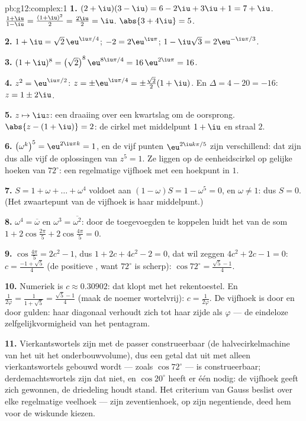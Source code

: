 \begin{solution}{pb:g12:complex:1}
\textbf{1.} $(2 + \iu)(3 - \iu) = 6 - 2\iu + 3\iu + 1 = 7 + \iu$. \quad
$\frac{1 + \iu}{1 - \iu} = \frac{(1 + \iu)^2}{2} = \frac{2\iu}{2} = \iu$.
\quad $\abs{3 + 4\iu} = 5$.

\textbf{2.} $1 + \iu = \sqrt2\,\eu^{\iu\pi/4}$; $-2 = 2\eu^{\iu\pi}$;
$1 - \iu\sqrt3 = 2\eu^{-\iu\pi/3}$.

\textbf{3.} $(1 + \iu)^8 = \left(\sqrt2\right)^8 \eu^{8\iu\pi/4} =
16\,\eu^{2\iu\pi} = 16$.

\textbf{4.} $z^2 = \eu^{\iu\pi/2}$:
$z = \pm\eu^{\iu\pi/4} = \pm\frac{\sqrt2}{2}(1 + \iu)$. En
$\Delta = 4 - 20 = -16$: $z = 1 \pm 2\iu$.

\textbf{5.} $z \mapsto \iu z$: een draaiing over een kwartslag om de
oorsprong. $\abs{z - (1 + \iu)} = 2$: de cirkel met middelpunt $1 + \iu$ en
straal $2$.

\textbf{6.} $\left(\omega^k\right)^5 = \eu^{2\iu\pi k} = 1$, en de vijf punten
$\eu^{2\iu k\pi/5}$ zijn verschillend: dat zijn dus alle vijf de oplossingen
van $z^5 = 1$. Ze liggen op de eenheidscirkel op gelijke hoeken van
$72^\circ$: een regelmatige vijfhoek met een hoekpunt in $1$.

\textbf{7.} $S = 1 + \omega + \dots + \omega^4$ voldoet aan
$(1 - \omega)S = 1 - \omega^5 = 0$, en $\omega \neq 1$: dus $S = 0$. (Het
zwaartepunt van de vijfhoek is haar middelpunt.)

\textbf{8.} $\omega^4 = \overline\omega$ en $\omega^3 = \overline{\omega^2}$:
door de toegevoegden te koppelen luidt het  van de som
$1 + 2\cos\frac{2\pi}{5} + 2\cos\frac{4\pi}{5} = 0$.

\textbf{9.} $\cos\frac{4\pi}{5} = 2c^2 - 1$, dus $1 + 2c + 4c^2 - 2 = 0$, dat
wil zeggen $4c^2 + 2c - 1 = 0$: $c = \frac{-1 + \sqrt5}{4}$ (de positieve
, want $72^\circ$ is scherp): $\cos 72^\circ = \frac{\sqrt5 - 1}{4}$.

\textbf{10.} Numeriek is $c \approx 0.30902$: dat klopt met het rekentoestel.
En $\frac{1}{2\varphi} = \frac{1}{1 + \sqrt5} = \frac{\sqrt5 - 1}{4}$ (maak de
noemer wortelvrij): $c = \frac{1}{2\varphi}$. De vijfhoek is door en door
gulden: haar diagonaal verhoudt zich tot haar zijde als $\varphi$ --- de
eindeloze zelfgelijkvormigheid van het pentagram.

\textbf{11.} Vierkantswortels zijn met de passer construeerbaar (de
halvecirkelmachine van het   uit het onderbouwvolume),
dus een getal dat uit  met alleen vierkantswortels gebouwd
wordt --- zoals $\cos 72^\circ$ --- is construeerbaar; derdemachtswortels zijn
dat niet, en $\cos 20^\circ$ heeft er één nodig: de vijfhoek geeft zich
gewonnen, de driedeling houdt stand. Het criterium van Gauss beslist over elke
regelmatige veelhoek --- zijn zeventienhoek, op zijn negentiende, deed hem
voor de wiskunde kiezen.


\end{solution}

